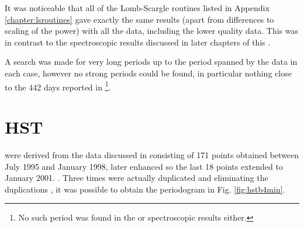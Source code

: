 \begin{table}[!htbp]
\centering
{}
\caption{Summary of three strongest periods taken from Class B and lower quality values in {\asas} datasets for {\prox}
  based upon magnitudes measured between December 2000 and September 2009 binned to 18 minutes.}
\protect\label{table:lqasas}
\end{table}

It was noticeable that all of the Lomb-Scargle routines listed in Appendix \ref{chapter:lsroutines} gave exactly
the same results (apart from differences to scaling of the power) with all the {\asas} data, including the lower quality
data. This was in contrast to the spectroscopic results discussed in later chapters of this \paperorthesis.

A search was made for very long periods up to the period spanned by the data in each case, however no strong periods
could be found, in particular nothing close to the 442 days reported in \citet{cincunegui07}\footnote{No such period was
  found in the {\hst} or spectroscopic results either.}.

\section{HST}
\protect\label{section:hst}

 were derived from the {\hst} data discussed in
 consisting of 171 points obtained between July 1995 and
January 1998, later enhanced so the last 18 points extended to January 2001. . Three times were actually duplicated and eliminating the
duplications , it was possible to obtain the periodogram in
Fig. \ref{fig:hstb4min}.

